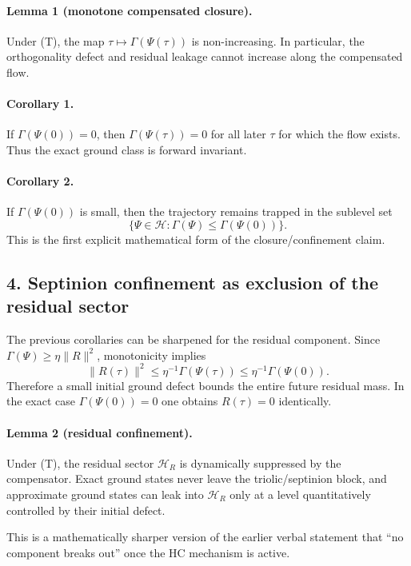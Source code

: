 \documentclass[12pt,a4paper]{article}
\begin{document}
\paragraph{Lemma 1 (monotone compensated closure).}
Under \textup{(T)}, the map $\tau\mapsto \Gamma(\Psi(\tau))$ is non-increasing. In
particular, the orthogonality defect and residual leakage cannot increase along
the compensated flow.

\paragraph{Corollary 1.}
If $\Gamma(\Psi(0))=0$, then $\Gamma(\Psi(\tau))=0$ for all later $\tau$ for which
the flow exists. Thus the exact ground class is forward invariant.

\paragraph{Corollary 2.}
If $\Gamma(\Psi(0))$ is small, then the trajectory remains trapped in the
sublevel set
\[
\{\Psi\in\mathcal H: \Gamma(\Psi)\le \Gamma(\Psi(0))\}.
\]
This is the first explicit mathematical form of the closure/confinement claim.

\subsection*{4. Septinion confinement as exclusion of the residual sector}
The previous corollaries can be sharpened for the residual component. Since
$\Gamma(\Psi)\ge \eta\|R\|^2$, monotonicity implies
\[
\|R(\tau)\|^2 \le \eta^{-1}\Gamma(\Psi(\tau)) \le \eta^{-1}\Gamma(\Psi(0)).
\]
Therefore a small initial ground defect bounds the entire future residual mass.
In the exact case $\Gamma(\Psi(0))=0$ one obtains $R(\tau)=0$ identically.

\paragraph{Lemma 2 (residual confinement).}
Under \textup{(T)}, the residual sector $\mathcal H_R$ is dynamically suppressed by
the compensator. Exact ground states never leave the triolic/septinion block,
and approximate ground states can leak into $\mathcal H_R$ only at a level
quantitatively controlled by their initial defect.

This is a mathematically sharper version of the earlier verbal statement that
``no component breaks out'' once the HC mechanism is active.
\end{document}
